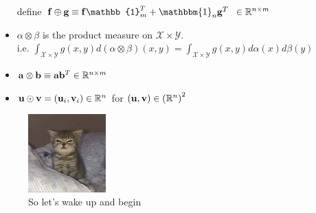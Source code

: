 \begin{itemize}
    define $\mathbf{f} \oplus \mathbf{g} \equiv \mathbf{f} \mathbb{1}_{m}^{T} + \mathbbm{1}_{n} \mathbf{g} ^{T} \;\; \in  \R^{n \times m}$
  \item $\alpha \otimes \beta$ is the product measure on $\mathcal{X} \times \mathcal{Y}$.\\
    i.e. $\int_{\mathcal{X}\times \mathcal{Y}} g(x,y) d(\alpha \otimes \beta) (x, y) = \int_{\mathcal{X}\times \mathcal{Y}} g(x,y) d\alpha(x) d\beta(y)$ 
  \item $\mathbf{a} \otimes \mathbf{b} \equiv \mathbf{a} \mathbf{b}^{T} \in \mathbb{R}^{n \times m}$
  \item $\mathbf{u} \odot \mathbf{v} = \left( \mathbf{u}_i, \mathbf{v}_i \right) \in  \mathbb{R}^{n}$ for $\left( \mathbf{u}, \mathbf{v} \right) \in  \left( \mathbb{R}^{n} \right) ^2$
\end{itemize}

\begin{figure}[h]
  \centering
  \includegraphics[width=3cm]{./figures/sleepy-kitty.jpeg}
  \caption{So let's wake up and begin}
\end{figure} 










